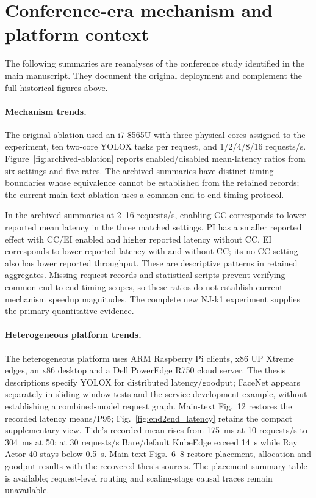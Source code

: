 \section*{Conference-era mechanism and platform context}
The following summaries are reanalyses of the conference study identified in the main manuscript. They document the original deployment and complement the full historical figures above.

\paragraph{Mechanism trends.}
The original ablation used an i7-8565U with three physical cores assigned to the experiment, ten two-core YOLOX tasks per request, and 1/2/4/8/16 requests/s. Figure~\ref{fig:archived-ablation} reports enabled/disabled mean-latency ratios from six settings and five rates. The archived summaries have distinct timing boundaries whose equivalence cannot be established from the retained records; the current main-text ablation uses a common end-to-end timing protocol.

In the archived summaries at 2--16 requests/s, enabling CC corresponds to lower reported mean latency in the three matched settings. PI has a smaller reported effect with CC/EI enabled and higher reported latency without CC. EI corresponds to lower reported latency with and without CC; its no-CC setting also has lower reported throughput. These are descriptive patterns in retained aggregates. Missing request records and statistical scripts prevent verifying common end-to-end timing scopes, so these ratios do not establish current mechanism speedup magnitudes. The complete new NJ-k1 experiment supplies the primary quantitative evidence.

\paragraph{Heterogeneous platform trends.}
The heterogeneous platform uses ARM Raspberry Pi clients, x86 UP Xtreme edges, an x86 desktop and a Dell PowerEdge R750 cloud server. The thesis descriptions specify YOLOX for distributed latency/goodput; FaceNet appears separately in sliding-window tests and the service-development example, without establishing a combined-model request graph. Main-text Fig.~12 restores the recorded latency means/P95; Fig.~\ref{fig:end2end_latency} retains the compact supplementary view. Tide's recorded mean rises from 175~ms at 10 requests/s to 304~ms at 50; at 30 requests/s Bare/default KubeEdge exceed 14~s while Ray Actor-40 stays below 0.5~s. Main-text Figs.~6--8 restore placement, allocation and goodput results with the recovered thesis sources. The placement summary table is available; request-level routing and scaling-stage causal traces remain unavailable.

